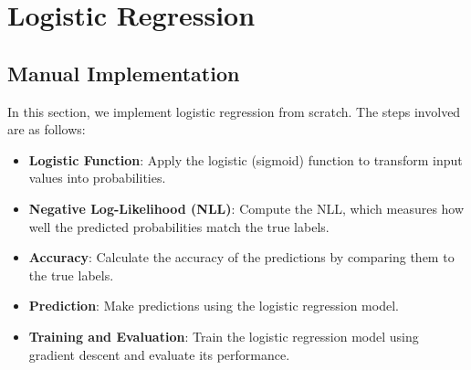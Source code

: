\documentclass[a4paper,12pt]{article}
\begin{document}
\section{Logistic Regression}

\subsection{Manual Implementation}
In this section, we implement logistic regression from scratch. The steps involved are as follows:

\begin{itemize}
    \item \textbf{Logistic Function}: Apply the logistic (sigmoid) function to transform input values into probabilities.
    \item \textbf{Negative Log-Likelihood (NLL)}: Compute the NLL, which measures how well the predicted probabilities match the true labels.
    \item \textbf{Accuracy}: Calculate the accuracy of the predictions by comparing them to the true labels.
    \item \textbf{Prediction}: Make predictions using the logistic regression model.
    \item \textbf{Training and Evaluation}: Train the logistic regression model using gradient descent and evaluate its performance.
\end{itemize}
\end{document}
